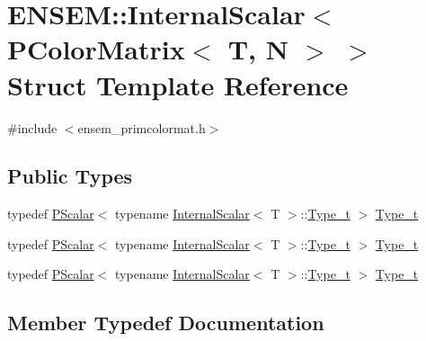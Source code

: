 \hypertarget{structENSEM_1_1InternalScalar_3_01PColorMatrix_3_01T_00_01N_01_4_01_4}{}\section{E\+N\+S\+EM\+:\+:Internal\+Scalar$<$ P\+Color\+Matrix$<$ T, N $>$ $>$ Struct Template Reference}
\label{structENSEM_1_1InternalScalar_3_01PColorMatrix_3_01T_00_01N_01_4_01_4}


{\ttfamily \#include $<$ensem\+\_\+primcolormat.\+h$>$}

\subsection*{Public Types}
\begin{DoxyCompactItemize}
\item 
typedef \mbox{\hyperlink{classENSEM_1_1PScalar}{P\+Scalar}}$<$ typename \mbox{\hyperlink{structENSEM_1_1InternalScalar}{Internal\+Scalar}}$<$ T $>$\+::\mbox{\hyperlink{structENSEM_1_1InternalScalar_3_01PColorMatrix_3_01T_00_01N_01_4_01_4_a9b1738a10ca607ed8d2cee3b7e88d1b1}{Type\+\_\+t}} $>$ \mbox{\hyperlink{structENSEM_1_1InternalScalar_3_01PColorMatrix_3_01T_00_01N_01_4_01_4_a9b1738a10ca607ed8d2cee3b7e88d1b1}{Type\+\_\+t}}
\item 
typedef \mbox{\hyperlink{classENSEM_1_1PScalar}{P\+Scalar}}$<$ typename \mbox{\hyperlink{structENSEM_1_1InternalScalar}{Internal\+Scalar}}$<$ T $>$\+::\mbox{\hyperlink{structENSEM_1_1InternalScalar_3_01PColorMatrix_3_01T_00_01N_01_4_01_4_a9b1738a10ca607ed8d2cee3b7e88d1b1}{Type\+\_\+t}} $>$ \mbox{\hyperlink{structENSEM_1_1InternalScalar_3_01PColorMatrix_3_01T_00_01N_01_4_01_4_a9b1738a10ca607ed8d2cee3b7e88d1b1}{Type\+\_\+t}}
\item 
typedef \mbox{\hyperlink{classENSEM_1_1PScalar}{P\+Scalar}}$<$ typename \mbox{\hyperlink{structENSEM_1_1InternalScalar}{Internal\+Scalar}}$<$ T $>$\+::\mbox{\hyperlink{structENSEM_1_1InternalScalar_3_01PColorMatrix_3_01T_00_01N_01_4_01_4_a9b1738a10ca607ed8d2cee3b7e88d1b1}{Type\+\_\+t}} $>$ \mbox{\hyperlink{structENSEM_1_1InternalScalar_3_01PColorMatrix_3_01T_00_01N_01_4_01_4_a9b1738a10ca607ed8d2cee3b7e88d1b1}{Type\+\_\+t}}
\end{DoxyCompactItemize}


\subsection{Member Typedef Documentation}
\mbox{\label{structENSEM_1_1InternalScalar_3_01PColorMatrix_3_01T_00_01N_01_4_01_4_a9b1738a10ca607ed8d2cee3b7e88d1b1}} 
